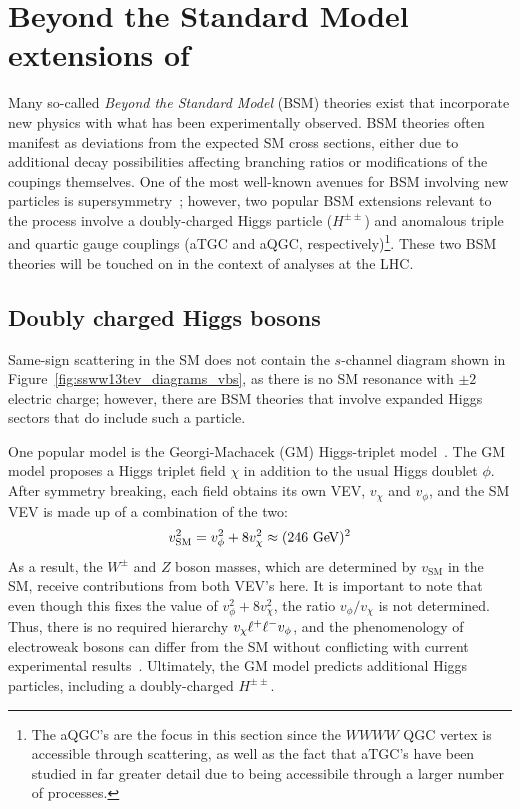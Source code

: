 \section{Beyond the Standard Model extensions of \ssww}\label{ssww13tev:extensions}
Many so-called \emph{Beyond the Standard Model} (BSM) theories exist that incorporate new physics with what has been experimentally observed.
BSM theories often manifest as deviations from the expected SM cross sections, either due to additional decay possibilities affecting branching ratios or modifications of the coupings themselves.
One of the most well-known avenues for BSM involving new particles is supersymmetry~\cite{1997.susy-primer}; however, two popular BSM extensions relevant to the \ssww process involve a doubly-charged Higgs particle ($H^{\pm\pm}$) and anomalous triple and quartic gauge couplings (aTGC and aQGC, respectively)\footnote{The aQGC's are the focus in this section since the $WWWW$ QGC vertex is accessible through \sswwnojj scattering, as well as the fact that aTGC's have been studied in far greater detail due to being accessibile through a larger number of processes.}.
These two BSM theories will be touched on in the context of \ssww analyses at the LHC.

\subsection{Doubly charged Higgs bosons}\label{ssww13tev:hpp}
Same-sign \sswwnojj scattering in the SM does not contain the $s$-channel diagram shown in Figure~\ref{fig:ssww13tev_diagrams_vbs}, as there is no SM resonance with $\pm 2$ electric charge; however, there are BSM theories that involve expanded Higgs sectors that do include such a particle.

One popular model is the Georgi-Machacek (GM) Higgs-triplet model~\cite{1985.doubly-charged-higgs}. 
The GM model proposes a Higgs triplet field $\chi$ in addition to the usual Higgs doublet $\phi$.
After symmetry breaking, each field obtains its own VEV, $v_\chi$ and $v_\phi$, and the SM VEV is made up of a combination of the two:
\begin{equation}
  v_{\textrm{SM}}^2 = v_\phi^2+8 v_\chi^2 \approx (246\gev)^2
\end{equation}
As a result, the $W^\pm$ and $Z$ boson masses, which are determined by $v_{\textrm{SM}}$ in the SM, receive contributions from both VEV's here.
It is important to note that even though this fixes the value of $v_\phi^2+8 v_\chi^2$, the ratio $v_\phi/v_\chi$ is not determined.
Thus, there is no required hierarchy $v_\chi \muchless v_\phi$, and the phenomenology of electroweak bosons can differ from the SM without conflicting with current experimental results~\cite{2013.triplet-higgs-lhc}.
Ultimately, the GM model predicts additional Higgs particles, including a doubly-charged $H^{\pm\pm}$.

